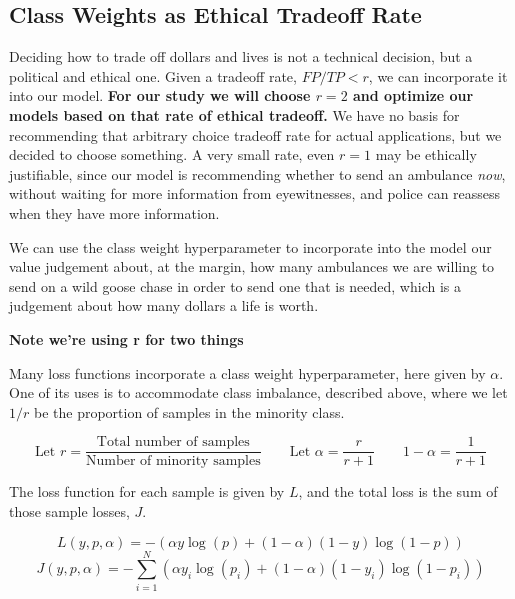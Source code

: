\subsection{Class Weights as Ethical Tradeoff Rate}

Deciding how to trade off dollars and lives is not a technical decision, but a political and ethical one.  Given a tradeoff rate, $FP/TP < r$, we can incorporate it into our model.  {\bf For our study we will choose $r=2$ and optimize our models based on that rate of ethical tradeoff. } We have no basis for recommending that arbitrary choice tradeoff rate for actual applications, but we decided to choose something.  A very small rate, even $r=1$ may be ethically justifiable, since our model is recommending whether to send an ambulance {\it now}, without waiting for more information from eyewitnesses, and police can reassess when they have more information.  

We can use the class weight hyperparameter to incorporate into the model our value judgement about, at the margin, how many ambulances we are willing to send on a wild goose chase in order to send one that is needed, which is a judgement about how many dollars a life is worth.  

{\bf Note we're using r for two things}

Many loss functions incorporate a class weight hyperparameter, here given by $\alpha$.  One of its uses is to accommodate class imbalance, described above, where we let $1/r$ be the proportion of samples in the minority class.

$$\text{Let } r = \frac{ \text{Total number of samples}}{\text{Number of minority samples}} \qquad  \text{Let } \alpha = \frac{r}{r+1} \qquad 1-\alpha = \frac{1}{r+1}$$

The loss function for each sample is given by $L$, and the total loss is the sum of those sample losses, $J$.  

$$L(y,p,\alpha) = - 
	\left( 
		\alpha y \log \left( p \right) + 
		\left( 1-\alpha \right) \left( 1-y \right) \log \left( 1-p \right) 
	\right) 
$$
$$J(y,p,\alpha) = - \sum_{i=1}^N 
	\left( 
		\alpha y_i \log \left( p_i \right) + 
		\left( 1-\alpha \right) \left( 1-y_i \right) \log \left( 1-p_i \right) 
	\right) 
$$

